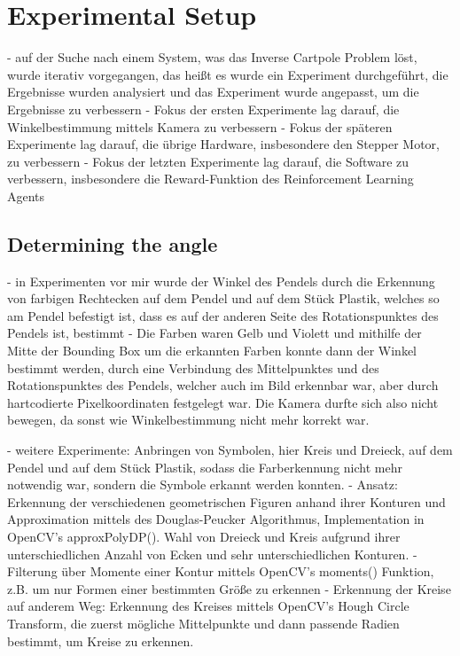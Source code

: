 \chapter{Experimental Setup}

- auf der Suche nach einem System, was das Inverse Cartpole Problem löst, wurde iterativ vorgegangen, das heißt es wurde ein Experiment durchgeführt, die Ergebnisse wurden analysiert und das Experiment wurde angepasst, um die Ergebnisse zu verbessern
- Fokus der ersten Experimente lag darauf, die Winkelbestimmung mittels Kamera zu verbessern
- Fokus der späteren Experimente lag darauf, die übrige Hardware, insbesondere den Stepper Motor, zu verbessern
- Fokus der letzten Experimente lag darauf, die Software zu verbessern, insbesondere die Reward-Funktion des Reinforcement Learning Agents

\section{Determining the angle}
- in Experimenten vor mir wurde der Winkel des Pendels durch die Erkennung von farbigen Rechtecken auf dem Pendel und auf dem Stück Plastik, welches so am Pendel befestigt ist, dass es auf der anderen Seite des Rotationspunktes des Pendels ist, bestimmt
- Die Farben waren Gelb und Violett und mithilfe der Mitte der Bounding Box um die erkannten Farben konnte dann der Winkel bestimmt werden, durch eine Verbindung des Mittelpunktes und des Rotationspunktes des Pendels, welcher auch im Bild erkennbar war, aber durch hartcodierte Pixelkoordinaten festgelegt war. Die Kamera durfte sich also nicht bewegen, da sonst wie Winkelbestimmung nicht mehr korrekt war.

- weitere Experimente: Anbringen von Symbolen, hier Kreis und Dreieck, auf dem Pendel und auf dem Stück Plastik, sodass die Farberkennung nicht mehr notwendig war, sondern die Symbole erkannt werden konnten.
- Ansatz: Erkennung der verschiedenen geometrischen Figuren anhand ihrer Konturen und Approximation mittels des Douglas-Peucker Algorithmus, Implementation in OpenCV's approxPolyDP(). Wahl von Dreieck und Kreis aufgrund ihrer unterschiedlichen Anzahl von Ecken und sehr unterschiedlichen Konturen.
- Filterung über Momente einer Kontur mittels OpenCV's moments() Funktion, z.B. um nur Formen einer bestimmten Größe zu erkennen
- Erkennung der Kreise auf anderem Weg: Erkennung des Kreises mittels OpenCV's Hough Circle Transform, die zuerst mögliche Mittelpunkte und dann passende Radien bestimmt, um Kreise zu erkennen. 


